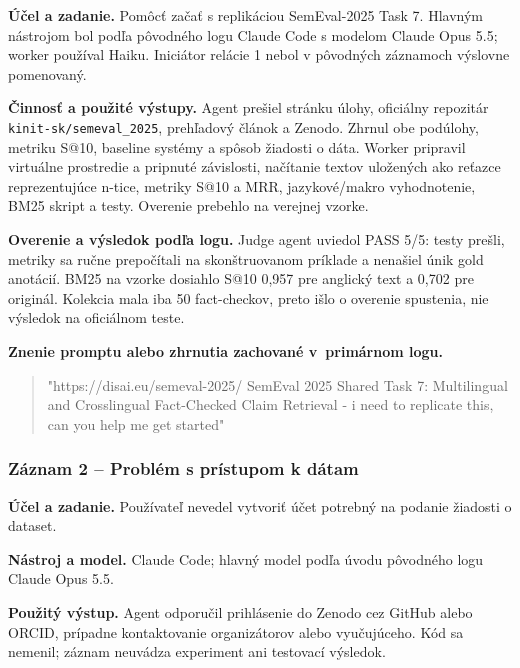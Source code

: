 \par\noindent \textbf{Účel a zadanie.} Pomôcť začať s replikáciou SemEval-2025 Task 7. Hlavným nástrojom bol podľa pôvodného logu Claude Code s modelom Claude Opus 5.5; worker používal Haiku. Iniciátor relácie 1 nebol v pôvodných záznamoch výslovne pomenovaný.\par\smallskip
\par\noindent \textbf{Činnosť a použité výstupy.} Agent prešiel stránku úlohy, oficiálny repozitár \texttt{kinit-\allowbreak{}sk/\allowbreak{}semeval\_\allowbreak{}2025}, prehľadový článok a Zenodo. Zhrnul obe podúlohy, metriku S@10, baseline systémy a spôsob žiadosti o dáta. Worker pripravil virtuálne prostredie a pripnuté závislosti, načítanie textov uložených ako reťazce reprezentujúce n-tice, metriky S@10 a MRR, jazykové/makro vyhodnotenie, BM25 skript a testy. Overenie prebehlo na verejnej vzorke.\par\smallskip
\par\noindent \textbf{Overenie a výsledok podľa logu.} Judge agent uviedol PASS 5/5: testy prešli, metriky sa ručne prepočítali na skonštruovanom príklade a nenašiel únik gold anotácií. BM25 na vzorke dosiahlo S@10 0,957 pre anglický text a 0,702 pre originál. Kolekcia mala iba 50 fact-checkov, preto išlo o overenie spustenia, nie výsledok na oficiálnom teste.\par\smallskip

\par\noindent\textbf{Znenie promptu alebo zhrnutia zachované v~primárnom logu.}

\begin{quote}\normalsize "https://disai.eu/semeval-2025/ SemEval 2025 Shared Task 7: Multilingual and Crosslingual Fact-Checked Claim Retrieval - i need to replicate this, can you help me get started"\end{quote}

\subsubsection*{Záznam 2 -- Problém s prístupom k dátam}


\par\noindent \textbf{Účel a zadanie.} Používateľ nevedel vytvoriť účet potrebný na podanie žiadosti o dataset.\par\smallskip
\par\noindent \textbf{Nástroj a model.} Claude Code; hlavný model podľa úvodu pôvodného logu Claude Opus 5.5.\par\smallskip
\par\noindent \textbf{Použitý výstup.} Agent odporučil prihlásenie do Zenodo cez GitHub alebo ORCID, prípadne kontaktovanie organizátorov alebo vyučujúceho. Kód sa nemenil; záznam neuvádza experiment ani testovací výsledok.\par\smallskip

